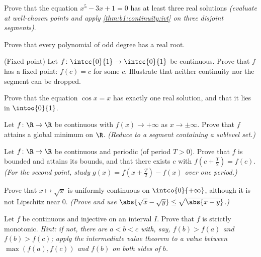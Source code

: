 \begin{exercise}[$\star$]\label{exo:b1:continuity:3}
Prove that the equation $x^5 - 3x + 1 = 0$ has at least three real
solutions \emph{(evaluate at well-chosen points and apply
\cref{thm:b1:continuity:ivt} on three disjoint segments)}.
\end{exercise}

\begin{exercise}[$\star$]\label{exo:b1:continuity:4}
Prove that every polynomial of odd degree has a real root.
\end{exercise}

\begin{exercise}[$\star\star$]\label{exo:b1:continuity:5}
(Fixed point) Let $f \colon \intcc{0}{1} \to \intcc{0}{1}$ be
continuous. Prove that $f$ has a fixed point: $f(c) = c$ for some
$c$. Illustrate that neither continuity nor the segment can be
dropped.
\end{exercise}

\begin{exercise}[$\star\star$]\label{exo:b1:continuity:6}
Prove that the equation $\cos x = x$ has exactly one real solution,
and that it lies in $\intoo{0}{1}$.
\end{exercise}

\begin{exercise}[$\star\star$]\label{exo:b1:continuity:7}
Let $f \colon \R \to \R$ be continuous with $f(x) \to +\infty$ as $x
\to \pm\infty$. Prove that $f$ attains a global minimum on $\R$.
\emph{(Reduce to a segment containing a sublevel set.)}
\end{exercise}

\begin{exercise}[$\star\star$]\label{exo:b1:continuity:8}
Let $f \colon \R \to \R$ be continuous and periodic (of period $T >
0$). Prove that $f$ is bounded and attains its bounds, and that there
exists $c$ with $f(c + \frac T2) = f(c)$. \emph{(For the second
point, study $g(x) = f(x + \frac T2) - f(x)$ over one period.)}
\end{exercise}

\begin{exercise}[$\star\star$]\label{exo:b1:continuity:9}
Prove that $x \mapsto \sqrt x$ is uniformly continuous on
$\intco{0}{+\infty}$, although it is not Lipschitz near $0$.
\emph{(Prove and use $\abs{\sqrt x - \sqrt y} \leq \sqrt{\abs{x -
y}}$.)}
\end{exercise}

\begin{exercise}[$\star\star\star$]\label{exo:b1:continuity:10}
Let $f$ be continuous and injective on an interval $I$. Prove that
$f$ is strictly monotonic. \emph{Hint: if not, there are $a < b < c$
with, say, $f(b) > f(a)$ and $f(b) > f(c)$; apply the intermediate
value theorem to a value between $\max(f(a), f(c))$ and $f(b)$ on
both sides of $b$.}
\end{exercise}

